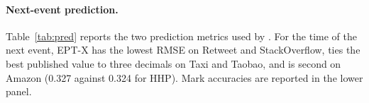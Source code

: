 \paragraph{Next-event prediction.} Table~\ref{tab:pred} reports the two prediction metrics used by
\citet{chang2025deep}. For the time of the next event, EPT-X has the lowest RMSE on Retweet and
StackOverflow, ties the best published value to three decimals on Taxi and Taobao, and is second on
Amazon (0.327 against 0.324 for HHP). Mark accuracies are reported in the lower panel.

\begin{table}[!htbp]\centering\small
\caption{Next-event prediction on the public benchmarks: time RMSE (top, lower is better; Retweet
in seconds) and mark accuracy (bottom, \%, higher is better). Published numbers from
\citet{chang2025deep} and \citet{boyd2025hyper}, Table~2(b,c) of each. Bold: best; underlined: second best; shaded: ours.}\label{tab:pred}
\setlength{\tabcolsep}{5pt}
\\[6pt]

\end{table}

\FloatBarrier
